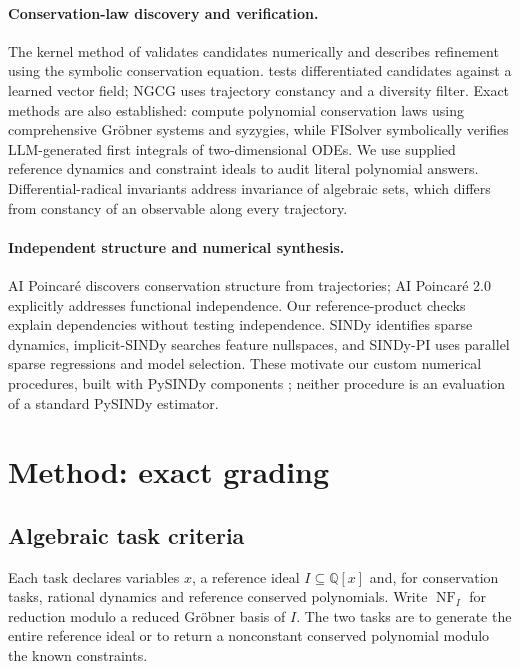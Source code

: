 \documentclass[10pt]{article}
\newcommand{\NF}{\operatorname{NF}}
\newcommand{\Q}{\mathbb{Q}}
\begin{document}
\paragraph{Conservation-law discovery and verification.} The kernel method of \citet{mebratie2025conservation} validates candidates numerically and describes refinement using the symbolic conservation equation. \citet{hybridode2025} tests differentiated candidates against a learned vector field; NGCG \citep{ngcg2026} uses trajectory constancy and a diversity filter. Exact methods are also established: \citet{desoeuvres2024polynomial} compute polynomial conservation laws using comprehensive Gr\"obner systems and syzygies, while FISolver \citep{fisolver2026} symbolically verifies LLM-generated first integrals of two-dimensional ODEs. We use supplied reference dynamics and constraint ideals to audit literal polynomial answers. Differential-radical invariants \citep{ghorbal2014differential} address invariance of algebraic sets, which differs from constancy of an observable along every trajectory.

\paragraph{Independent structure and numerical synthesis.} AI Poincar\'e \citep{liu2021poincare} discovers conservation structure from trajectories; AI Poincar\'e 2.0 \citep{liu2022poincare} explicitly addresses functional independence. Our reference-product checks explain dependencies without testing independence. SINDy \citep{brunton2016sindy} identifies sparse dynamics, implicit-SINDy \citep{mangan2016implicit} searches feature nullspaces, and SINDy-PI \citep{kaheman2020sindypi} uses parallel sparse regressions and model selection. These motivate our custom numerical procedures, built with PySINDy components \citep{kaptanoglu2022pysindy}; neither procedure is an evaluation of a standard PySINDy estimator.

\section{Method: exact grading}\label{sec:grader}

\subsection{Algebraic task criteria}

Each task declares variables $x$, a reference ideal $I\subseteq\Q[x]$ and, for conservation tasks, rational dynamics and reference conserved polynomials. Write $\NF_I$ for reduction modulo a reduced Gr\"obner basis of $I$. The two tasks are to generate the entire reference ideal or to return a nonconstant conserved polynomial modulo the known constraints.
\end{document}
